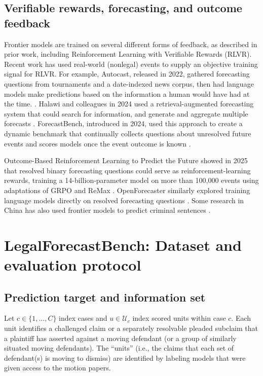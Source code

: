 \documentclass[11pt]{article}
\begin{document}
\subsection{Verifiable rewards, forecasting, and outcome feedback}
Frontier models are trained on several different forms of feedback, as described in prior work, including Reinforcement Learning with Verifiable Rewards (RLVR). Recent work has used real-world (nonlegal) events to supply an objective training signal for RLVR. For example, Autocast, released in 2022, gathered forecasting questions from tournaments and a date-indexed news corpus, then had language models make predictions based on the information a human would have had at the time. \citep{autocast}. Halawi and colleagues in 2024 used a retrieval-augmented forecasting system that could search for information, and generate and aggregate multiple forecasts \citep{halawi}. ForecastBench, introduced in 2024, used this approach to create a dynamic benchmark that continually collects questions about unresolved future events and scores models once the event outcome is known \citep{forecastbench}.

Outcome-Based Reinforcement Learning to Predict the Future showed in 2025 that resolved binary forecasting questions could serve as reinforcement-learning rewards, training a 14-billion-parameter model on more than 100,000 events using adaptations of GRPO and ReMax \citep{outcomerl}. OpenForecaster similarly explored training language models directly on resolved forecasting questions \citep{openforecaster}. Some research in China has also used frontier models to predict criminal sentences \citep{sentencing}.

\section{LegalForecastBench: Dataset and evaluation protocol}

\subsection{Prediction target and information set}
Let $c\in\{1,\ldots,C\}$ index cases and $u\in\mathcal U_c$ index scored units within case $c$. Each unit identifies a challenged claim or a separately resolvable pleaded subclaim that a plaintiff has asserted against a moving defendant (or a group of similarly situated moving defendants). The ``units'' (i.e., the claims that each set of defendant(s) is moving to dismiss) are identified by labeling models that were given access to the motion papers.
\end{document}
